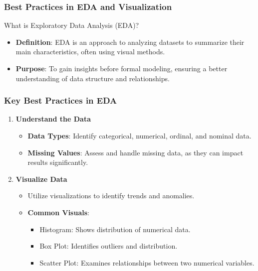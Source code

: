 \documentclass[aspectratio=169]{beamer}
\begin{document}
\begin{frame}[fragile]
    \frametitle{Best Practices in EDA and Visualization}
    \begin{block}{What is Exploratory Data Analysis (EDA)?}
        \begin{itemize}
            \item \textbf{Definition}: EDA is an approach to analyzing datasets to summarize their main characteristics, often using visual methods.
            \item \textbf{Purpose}: To gain insights before formal modeling, ensuring a better understanding of data structure and relationships.
        \end{itemize}
    \end{block}
\end{frame}

\begin{frame}[fragile]
    \frametitle{Key Best Practices in EDA}
    \begin{enumerate}
        \item \textbf{Understand the Data}
        \begin{itemize}
            \item \textbf{Data Types}: Identify categorical, numerical, ordinal, and nominal data.
            \item \textbf{Missing Values}: Assess and handle missing data, as they can impact results significantly.
        \end{itemize}
        
        \item \textbf{Visualize Data}
        \begin{itemize}
            \item Utilize visualizations to identify trends and anomalies.
            \item \textbf{Common Visuals}:
            \begin{itemize}
                \item Histogram: Shows distribution of numerical data.
                \item Box Plot: Identifies outliers and distribution.
                \item Scatter Plot: Examines relationships between two numerical variables.
            \end{itemize}
        \end{itemize}
    \end{enumerate}
\end{frame}
\end{document}
